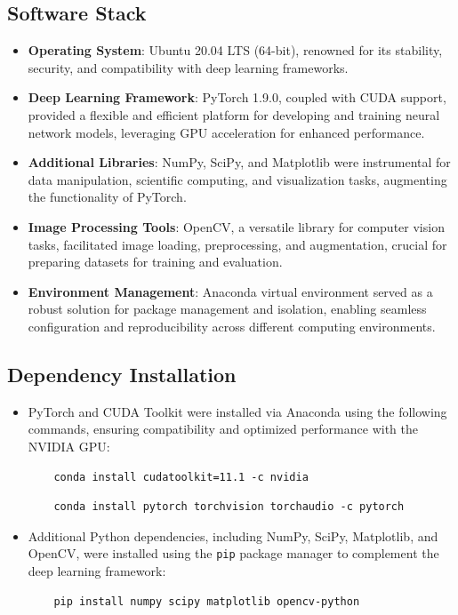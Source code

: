 \subsection{Software Stack}
\begin{itemize}
  \item \textbf{Operating System}: Ubuntu 20.04 LTS (64-bit), renowned for its stability, security, and compatibility with deep learning frameworks.
  \item \textbf{Deep Learning Framework}: PyTorch 1.9.0, coupled with CUDA support, provided a flexible and efficient platform for developing and training neural network models, leveraging GPU acceleration for enhanced performance.
  \item \textbf{Additional Libraries}: NumPy, SciPy, and Matplotlib were instrumental for data manipulation, scientific computing, and visualization tasks, augmenting the functionality of PyTorch.
  \item \textbf{Image Processing Tools}: OpenCV, a versatile library for computer vision tasks, facilitated image loading, preprocessing, and augmentation, crucial for preparing datasets for training and evaluation.
  \item \textbf{Environment Management}: Anaconda virtual environment served as a robust solution for package management and isolation, enabling seamless configuration and reproducibility across different computing environments.
\end{itemize}

\subsection{Dependency Installation}
\begin{itemize}
  \item PyTorch and CUDA Toolkit were installed via Anaconda using the following commands, ensuring compatibility and optimized performance with the NVIDIA GPU:
    \begin{verbatim}
    conda install cudatoolkit=11.1 -c nvidia
    \end{verbatim}
    \begin{verbatim}
    conda install pytorch torchvision torchaudio -c pytorch
    \end{verbatim}


  \item Additional Python dependencies, including NumPy, SciPy, Matplotlib, and OpenCV, were installed using the \texttt{pip} package manager to complement the deep learning framework:
    \begin{verbatim}
    pip install numpy scipy matplotlib opencv-python
    \end{verbatim}
\end{itemize}

